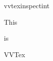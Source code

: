\documentclass{article}
\begin{document}
\newif\ifvvtex
\begingroup\expandafter\expandafter\expandafter\endgroup
\expandafter\ifx\csname vvtexinspectint\endcsname\relax
  \vvtexfalse
\else
  \vvtextrue
\fi

This 
\ifvvtex
is
\else
isn't
\fi
VVTex
\end{document}
